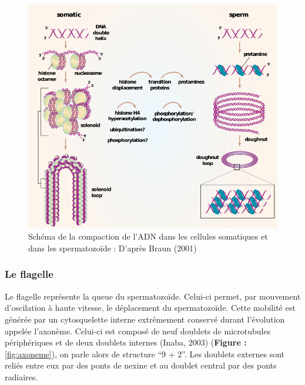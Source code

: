 \documentclass[12pt,twoside]{reedthesis}
\theoremstyle{definition}
\theoremstyle{definition}
\theoremstyle{remark}
\begin{document}
  \begin{figure}
  
  {\centering \includegraphics[scale=.55]{figure/noyau} 
  
  }
  
  \caption[Schéma de la compaction de l’ADN dans les cellules somatiques et dans les
  spermatozoïde]{Schéma de la compaction de l’ADN dans les cellules somatiques et dans les
  spermatozoïde : D'après Braun (2001)}\label{fig:noyau}
  \end{figure}
  
  \subsubsection{Le flagelle}\label{le-flagelle}
  
  Le flagelle représente la queue du spermatozoïde. Celui-ci permet, par
  mouvement d'oscilation à haute vitesse, le déplacement du spermatozoïde.
  Cette mobilité est générée par un cytosquelette interne extrêmement
  conservé durant l'évolution appelée l'axonème. Celui-ci est composé de
  neuf doublets de microtubules périphériques et de deux doublets internes
  (Inaba, 2003) (\textbf{Figure : }\ref{fig:axoneme}), on parle alors de
  structure ``9 + 2''. Les doublets externes sont reliés entre eux par des
  ponts de nexine et au doublet central par des ponts radiaires.
  
\end{document}
